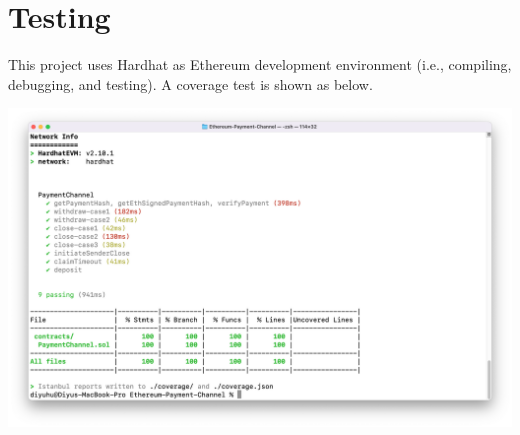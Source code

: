 \section{Testing}\label{sec:testing}
This project uses Hardhat as Ethereum development environment (i.e., compiling,
debugging, and testing).
A coverage test is shown as below.

\includegraphics[width=\textwidth]{./images/hardhat-coverage}